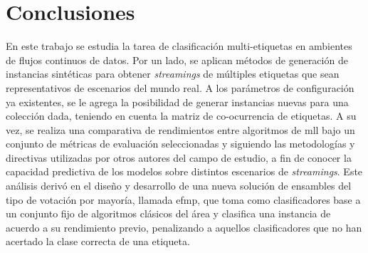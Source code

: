\chapter{Conclusiones}

En este trabajo se estudia la tarea de clasificación multi-etiquetas en
ambientes de flujos continuos de datos. Por un lado, se aplican métodos de
generación de instancias sintéticas para obtener \textit{streamings} de
múltiples etiquetas que sean representativos de escenarios del mundo real. A los
parámetros de configuración ya existentes, se le agrega la posibilidad de
generar instancias nuevas para una colección dada, teniendo en cuenta la matriz
de co-ocurrencia de etiquetas. A su vez, se realiza una comparativa de
rendimientos entre algoritmos de \acrshort{mll} bajo un conjunto de métricas de
evaluación seleccionadas y siguiendo las metodologías y directivas utilizadas
por otros autores del campo de estudio, a fin de conocer la capacidad predictiva
de los modelos sobre distintos escenarios de \textit{streamings}. Este análisis
derivó en el diseño y desarrollo de una nueva solución de ensambles del tipo de
votación por mayoría, llamada \acrshort{efmp}, que toma como clasificadores base
a un conjunto fijo de algoritmos clásicos del área y clasifica una instancia de
acuerdo a su rendimiento previo, penalizando a aquellos clasificadores que no
han acertado la clase correcta de una etiqueta.

